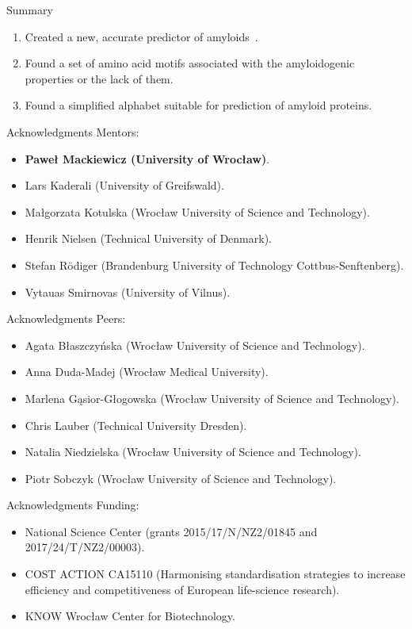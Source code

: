 \documentclass{beamer}\usepackage[]{graphicx}\usepackage[]{color}
\begin{document}
\begin{frame}{Summary}
\begin{enumerate}
\item Created a new, accurate predictor of amyloids~\citep{BurdukiewiczAmyloidogenicmotifsrevealed2017}.
\item Found a set of amino acid motifs associated with the amyloidogenic properties or the lack of them.
\item Found a simplified alphabet suitable for prediction of amyloid proteins.
\end{enumerate}
\end{frame}  

\begin{frame}{Acknowledgments}
Mentors:
\begin{itemize}
\item \textbf{Paweł Mackiewicz (University of Wrocław)}.
\item Lars Kaderali (University of Greifswald).
\item Małgorzata Kotulska (Wrocław University of Science and Technology).
\item Henrik Nielsen (Technical University of Denmark).
\item Stefan Rödiger (Brandenburg University of Technology Cottbus-Senftenberg).
\item Vytauas Smirnovas (University of Vilnus). 
\end{itemize}
\end{frame}


\begin{frame}{Acknowledgments}
Peers:
\begin{itemize}
\item Agata Błaszczyńska (Wrocław University of Science and Technology).
\item Anna Duda-Madej (Wrocław Medical University).
\item Marlena G\k{a}sior-Głogowska (Wrocław University of Science and Technology).
\item Chris Lauber (Technical University Dresden).
\item Natalia Niedzielska (Wrocław University of Science and Technology).
\item Piotr Sobczyk (Wrocław University of Science and Technology).
\end{itemize}

\end{frame}

\begin{frame}{Acknowledgments}
Funding:
\begin{itemize}
\item National Science Center (grants 2015/17/N/NZ2/01845 and 2017/24/T/NZ2/00003).
\item COST ACTION CA15110 (Harmonising standardisation strategies to increase efficiency and competitiveness of European life-science research).
\item KNOW Wrocław Center for Biotechnology.
\end{itemize}

\end{frame}
\end{document}
